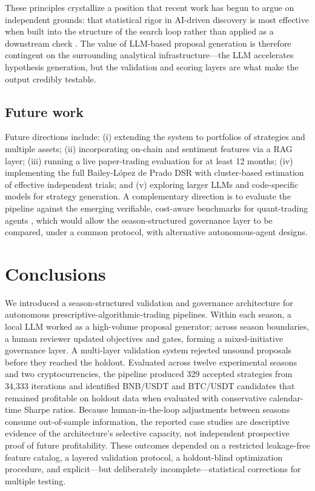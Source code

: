 \documentclass[11pt,a4paper]{article}
\begin{document}
These principles crystallize a position that recent work has begun to argue on independent grounds: that statistical rigor in AI-driven discovery is most effective when built into the structure of the search loop rather than applied as a downstream check \citep{benjamini_hochberg_1995}. The value of LLM-based proposal generation is therefore contingent on the surrounding analytical infrastructure---the LLM accelerates hypothesis generation, but the validation and scoring layers are what make the output credibly testable.

\subsection{Future work}\label{future-work}

Future directions include: (i) extending the system to portfolios of strategies and multiple assets; (ii) incorporating on-chain and sentiment features via a RAG layer; (iii) running a live paper-trading evaluation for at least 12 months; (iv) implementing the full Bailey-López de Prado DSR with cluster-based estimation of effective independent trials; and (v) exploring larger LLMs and code-specific models for strategy generation. A complementary direction is to evaluate the pipeline against the emerging verifiable, cost-aware benchmarks for quant-trading agents \citep{sun_2023_trademaster, sun_2023_prudex_compass}, which would allow the season-structured governance layer to be compared, under a common protocol, with alternative autonomous-agent designs.

\section{Conclusions}\label{conclusions}

We introduced a season-structured validation and governance architecture for autonomous prescriptive-algorithmic-trading pipelines. Within each season, a local LLM worked as a high-volume proposal generator; across season boundaries, a human reviewer updated objectives and gates, forming a mixed-initiative governance layer. A multi-layer validation system rejected unsound proposals before they reached the holdout. Evaluated across twelve experimental seasons and two cryptocurrencies, the pipeline produced 329 accepted strategies from 34,333 iterations and identified BNB/USDT and BTC/USDT candidates that remained profitable on holdout data when evaluated with conservative calendar-time Sharpe ratios. Because human-in-the-loop adjustments between seasons consume out-of-sample information, the reported case studies are descriptive evidence of the architecture's selective capacity, not independent prospective proof of future profitability. These outcomes depended on a restricted leakage-free feature catalog, a layered validation protocol, a holdout-blind optimization procedure, and explicit---but deliberately incomplete---statistical corrections for multiple testing.
\end{document}
